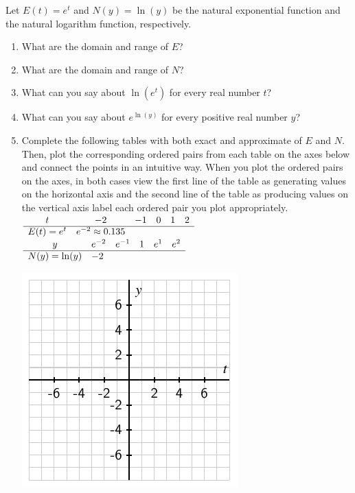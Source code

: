 \documentclass[nooutcomes]{ximera}
\begin{document}
\begin{exploration}
Let \(E(t) = e^t\) and \(N(y) = \ln(y)\) be the natural exponential function and the natural logarithm function, respectively.%

\begin{enumerate}[label=\alph*.]
\item
What are the domain and range of \(E\)?%
\item
What are the domain and range of \(N\)?%
\item
What can you say about \(\ln(e^t)\) for every real number \(t\)?%
\item
What can you say about \(e^{\ln(y)}\) for every positive real number \(y\)?%
\item
Complete the following tables with both exact and approximate of \(E\) and \(N\).  Then, plot the corresponding ordered pairs from each table on the axes below and connect the points in an intuitive way.  When you plot the ordered pairs on the axes, in both cases view the first line of the table as generating values on the horizontal axis and the second line of the table as producing values on the vertical axis label each ordered pair you plot appropriately.%
%
\\
$
\begin{array}{llllll}
\multicolumn{1}{c}{t}&\multicolumn{1}{c}{-2}&\multicolumn{1}{c}{-1}&\multicolumn{1}{c}{0}&\multicolumn{1}{c}{1}&\multicolumn{1}{c}{2}\\
\hline
E(t)=e^t&e^{-2} \approx 0.135&&&&
\end{array}
$
\\
$
\begin{array}{llllll}
\multicolumn{1}{c}{y}&\multicolumn{1}{c}{e^{-2}}&\multicolumn{1}{c}{e^{-1}}&\multicolumn{1}{c}{1}&\multicolumn{1}{c}{e^1}&\multicolumn{1}{c}{e^2}\\
\hline
N(y)=\ln(y)&-2&&&&
\end{array}
$
%

\includegraphics[width=1\linewidth]{images/exp-log-blank-axes}


\end{enumerate}
\end{exploration}
\end{document}
